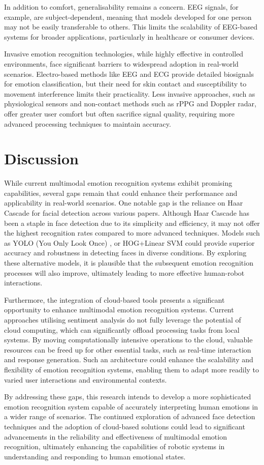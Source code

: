 In addition to comfort, generalisability remains a concern. EEG signals, for example, are subject-dependent, meaning that models developed for one person may not be easily transferable to others. This limits the scalability of EEG-based systems for broader applications, particularly in healthcare or consumer devices.

Invasive emotion recognition technologies, while highly effective in controlled environments, face significant barriers to widespread adoption in real-world scenarios. Electro-based methods like EEG and ECG provide detailed biosignals for emotion classification, but their need for skin contact and susceptibility to movement interference limits their practicality. Less invasive approaches, such as physiological sensors and non-contact methods such as rPPG and Doppler radar, offer greater user comfort but often sacrifice signal quality, requiring more advanced processing techniques to maintain accuracy.

\section{Discussion}
While current multimodal emotion recognition systems exhibit promising capabilities, several gaps remain that could enhance their performance and applicability in real-world scenarios. One notable gap is the reliance on Haar Cascade for facial detection across various papers. Although Haar Cascade has been a staple in face detection due to its simplicity and efficiency, it may not offer the highest recognition rates compared to more advanced techniques. Models such as YOLO (You Only Look Once) \cite{Redmon2015-eb}, or HOG+Linear SVM \cite{Singh2020-ui} could provide superior accuracy and robustness in detecting faces in diverse conditions. By exploring these alternative models, it is plausible that the subsequent emotion recognition processes will also improve, ultimately leading to more effective human-robot interactions.

Furthermore, the integration of cloud-based tools presents a significant opportunity to enhance multimodal emotion recognition systems. Current approaches utilising sentiment analysis do not fully leverage the potential of cloud computing, which can significantly offload processing tasks from local systems. By moving computationally intensive operations to the cloud, valuable resources can be freed up for other essential tasks, such as real-time interaction and response generation. Such an architecture could enhance the scalability and flexibility of emotion recognition systems, enabling them to adapt more readily to varied user interactions and environmental contexts.

By addressing these gaps, this research intends to develop a more sophisticated emotion recognition system capable of accurately interpreting human emotions in a wider range of scenarios. The continued exploration of advanced face detection techniques and the adoption of cloud-based solutions could lead to significant advancements in the reliability and effectiveness of multimodal emotion recognition, ultimately enhancing the capabilities of robotic systems in understanding and responding to human emotional states.



